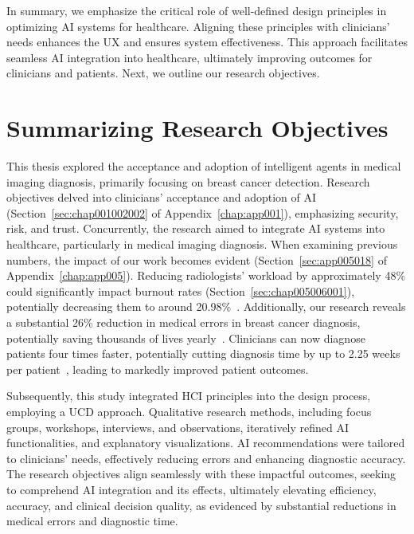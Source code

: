 \textcolor{revised}{In summary, we emphasize the critical role of well-defined design principles in optimizing \ac{AI} systems for healthcare.
Aligning these principles with clinicians' needs enhances the \ac{UX} and ensures system effectiveness.
This approach facilitates seamless \ac{AI} integration into healthcare, ultimately improving outcomes for clinicians and patients.
Next, we outline our research objectives.}

\section{Summarizing Research Objectives}
\label{sec:chap008003}

\textcolor{revised}{This thesis explored the acceptance and adoption of intelligent agents in medical imaging diagnosis, primarily focusing on breast cancer detection.
Research objectives delved into clinicians' acceptance and adoption of \ac{AI} (Section~\ref{sec:chap001002002} of Appendix~\ref{chap:app001}), emphasizing security, risk, and trust.
Concurrently, the research aimed to integrate \ac{AI} systems into healthcare, particularly in medical imaging diagnosis.
When examining previous numbers, the impact of our work becomes evident (Section~\ref{sec:app005018} of Appendix~\ref{chap:app005}).
Reducing radiologists' workload by approximately 48\% could significantly impact burnout rates (Section~\ref{sec:chap005006001}), potentially decreasing them to around 20.98\%~\cite{doi:10.1148/radiol.212631}.
Additionally, our research reveals a substantial 26\% reduction in medical errors in breast cancer diagnosis, potentially saving thousands of lives yearly~\cite{doi:10.3322/caac.21492}.
Clinicians can now diagnose patients four times faster, potentially cutting diagnosis time by up to 2.25 weeks per patient~\cite{WAYMEL2019327}, leading to markedly improved patient outcomes.}

\textcolor{revised}{Subsequently, this study integrated \ac{HCI} principles into the design process, employing a \ac{UCD} approach.
Qualitative research methods, including focus groups, workshops, interviews, and observations, iteratively refined \ac{AI} functionalities, and explanatory visualizations.
\ac{AI} recommendations were tailored to clinicians' needs, effectively reducing errors and enhancing diagnostic accuracy.
The research objectives align seamlessly with these impactful outcomes, seeking to comprehend \ac{AI} integration and its effects, ultimately elevating efficiency, accuracy, and clinical decision quality, as evidenced by substantial reductions in medical errors and diagnostic time.}

